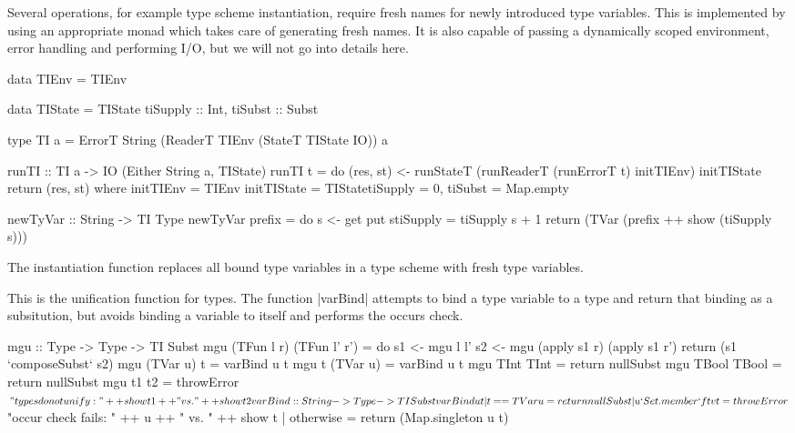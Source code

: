 \documentclass[a4paper,11pt]{article}
\begin{document}
Several operations, for example type scheme instantiation, require
fresh names for newly introduced type variables.  This is implemented
by using an appropriate monad which takes care of generating fresh
names.  It is also capable of passing a dynamically scoped
environment, error handling and performing I/O, but we will not go
into details here.
\begin{code}
data TIEnv = TIEnv  {}

data TIState = TIState {  tiSupply :: Int,
                          tiSubst :: Subst}

type TI a = ErrorT String (ReaderT TIEnv (StateT TIState IO)) a

runTI :: TI a -> IO (Either String a, TIState)
runTI t = 
    do (res, st) <- runStateT (runReaderT (runErrorT t) initTIEnv) initTIState
       return (res, st)
  where initTIEnv = TIEnv{}
        initTIState = TIState{tiSupply = 0,
                              tiSubst = Map.empty}

newTyVar :: String -> TI Type
newTyVar prefix =
    do  s <- get
        put s{tiSupply = tiSupply s + 1}
        return (TVar  (prefix ++ show (tiSupply s)))
\end{code}
%
The instantiation function replaces all bound type variables in a type
scheme with fresh type variables.
%
%
This is the unification function for types.  The function |varBind|
attempts to bind a type variable to a type and return that binding as
a subsitution, but avoids binding a variable to itself and performs
the occurs check.
%
\begin{code}
mgu :: Type -> Type -> TI Subst
mgu (TFun l r) (TFun l' r')  =  do  s1 <- mgu l l'
                                    s2 <- mgu (apply s1 r) (apply s1 r')
                                    return (s1 `composeSubst` s2)
mgu (TVar u) t               =  varBind u t
mgu t (TVar u)               =  varBind u t
mgu TInt TInt                =  return nullSubst
mgu TBool TBool              =  return nullSubst
mgu t1 t2                    =  throwError $ "types do not unify: " ++ show t1 ++ 
                                " vs. " ++ show t2

varBind :: String -> Type -> TI Subst
varBind u t  | t == TVar u           =  return nullSubst
             | u `Set.member` ftv t  =  throwError $ "occur check fails: " ++ u ++
                                         " vs. " ++ show t
             | otherwise             =  return (Map.singleton u t)
\end{code}
\end{document}
